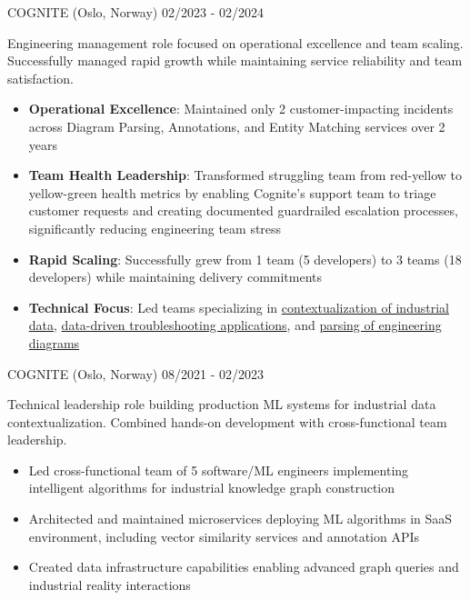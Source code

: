 \documentclass[singlesided,
               paper=a4,
               fontsize=10pt
              ]{my-resume}
\begin{document}
%
	{COGNITE (Oslo, Norway)}
	{02/2023 - 02/2024}
    {
        Engineering management role focused on operational excellence and team scaling. Successfully managed rapid growth while maintaining service reliability and team satisfaction.

        \begin{itemize}[leftmargin=2em]
            \item \textbf{Operational Excellence}: Maintained only 2 customer-impacting incidents across Diagram Parsing, Annotations, and Entity Matching services over 2 years
            \item \textbf{Team Health Leadership}: Transformed struggling team from red-yellow to yellow-green health metrics by enabling Cognite's support team to triage customer requests and creating documented guardrailed escalation processes, significantly reducing engineering team stress
            \item \textbf{Rapid Scaling}: Successfully grew from 1 team (5 developers) to 3 teams (18 developers) while maintaining delivery commitments
            \item \textbf{Technical Focus}: Led teams specializing in \href{https://www.cognite.com/en/contextualization}{contextualization of industrial data}, \href{https://www.cognite.com/en/industrial-canvas}{data-driven troubleshooting applications}, and \href{https://docs.cognite.com/cdf/integration/guides/contextualization/interactive_diagrams/}{parsing of engineering diagrams}
        \end{itemize}
    }
%
	{COGNITE (Oslo, Norway)}
	{08/2021 - 02/2023}
    {
        Technical leadership role building production ML systems for industrial data contextualization. Combined hands-on development with cross-functional team leadership.
        \begin{itemize}[leftmargin=2em]
            \item Led cross-functional team of 5 software/ML engineers implementing intelligent algorithms for industrial knowledge graph construction
            \item Architected and maintained microservices deploying ML algorithms in SaaS environment, including vector similarity services and annotation APIs
            \item Created data infrastructure capabilities enabling advanced graph queries and industrial reality interactions
        \end{itemize}
    }
\end{document}
